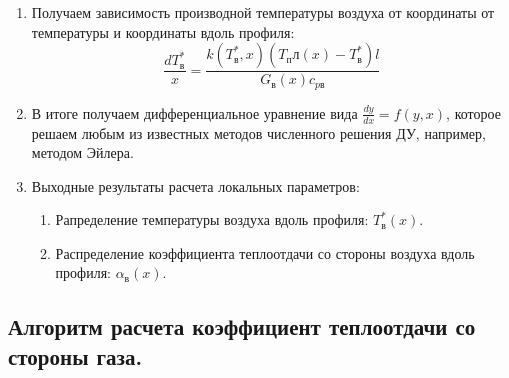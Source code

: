 \documentclass[a4paper,10pt]{article}
\begin{document}
\begin{enumerate}
        \item Получаем зависимость производной температуры воздуха от координаты от температуры и координаты
        вдоль профиля:
        \[
            \frac{dT_в^*}{x} = \frac{
                    k (T_в^*, x) (T_пл(x) - T_в^*) l
            }{
                    G_в(x) c_{pв}
            }
        \]

        \item В итоге получаем дифференциальное уравнение вида $\frac{dy}{dx} = f(y, x)$, которое решаем любым из
        известных методов численного решения ДУ, например, методом Эйлера.

        \item Выходные результаты расчета локальных параметров:

        \begin{enumerate}
            \item Рапределение температуры воздуха вдоль профиля: $T_в^*(x)$.
            \item Распределение коэффициента теплоотдачи со стороны воздуха вдоль профиля: $\alpha_в (x)$.
        \end{enumerate}

    \end{enumerate}

%    

    \subsection{Алгоритм расчета коэффициент теплоотдачи со стороны газа.}
\end{document}
